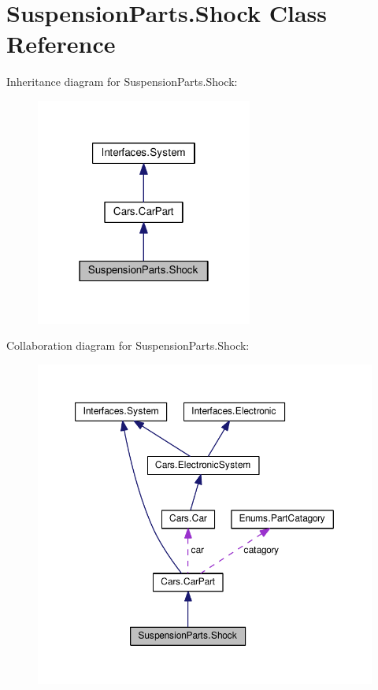 \hypertarget{classSuspensionParts_1_1Shock}{}\section{Suspension\+Parts.\+Shock Class Reference}
\label{classSuspensionParts_1_1Shock}


Inheritance diagram for Suspension\+Parts.\+Shock\+:\nopagebreak
\begin{figure}[H]
\begin{center}
\leavevmode
\includegraphics[width=202pt]{classSuspensionParts_1_1Shock__inherit__graph}
\end{center}
\end{figure}


Collaboration diagram for Suspension\+Parts.\+Shock\+:\nopagebreak
\begin{figure}[H]
\begin{center}
\leavevmode
\includegraphics[width=350pt]{classSuspensionParts_1_1Shock__coll__graph}
\end{center}
\end{figure}
